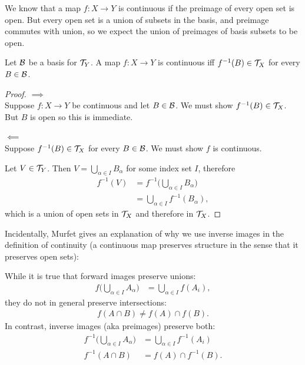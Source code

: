 We know that a map $f: X \to Y$ is continuous if the preimage of every open set is open. But every
open set is a union of subsets in the basis, and preimage commutes with union, so we expect the
union of preimages of basis subsets to be open.

\begin{lemma}
  Let $\mathcal B$ be a basis for $\mathcal T_Y$. A map $f: X \to Y$ is continuous
  iff $f^{-1}(B) \in \mathcal T_X$ for every $B \in \mathcal B$.
\end{lemma}

\begin{proof}
  $\implies$\\
  Suppose $f: X \to Y$ be continuous and let $B \in \mathcal B$. We must show $f^{-1}(B) \in \mathcal T_X$.
  But $B$ is open so this is immediate.

  $\impliedby$\\
  Suppose  $f^{-1}(B) \in \mathcal T_X$ for every $B \in \mathcal B$. We must show $f$ is continuous.

  Let $V \in \mathcal T_Y$. Then $V = \bigcup_{\alpha \in I} B_\alpha$ for some index set $I$, therefore
  \begin{align*}
    f^{-1}(V)
    &= f^{-1}\bigg(\bigcup_{\alpha \in I} B_\alpha\bigg) \\
    &= \bigcup_{\alpha \in I} f^{-1} (B_\alpha),
  \end{align*}
  which is a union of open sets in $\mathcal T_X$ and therefore in $\mathcal T_X$.
\end{proof}

Incidentally, Murfet gives an explanation of why we use inverse images in the definition of
continuity (a continuous map preserves structure in the sense that it preserves open sets):

While it is true that forward images preserve unions:
\begin{align*}
  f\big(\bigcup_{\alpha \in I} A_\alpha\big) &= \bigcup_{\alpha \in I} f(A_i),
\end{align*}
they do not in general preserve intersections:
\begin{align*}
  f(A \cap B) \neq f(A) \cap f(B).
\end{align*}
In contrast, inverse images (aka preimages) preserve both:
\begin{align*}
  f^{-1}\big(\bigcup_{\alpha \in I} A_\alpha\big) &= \bigcup_{\alpha \in I} f^{-1}(A_i) \\
  f^{-1}(A \cap B) &= f(A) \cap f^{-1}(B).
\end{align*}

